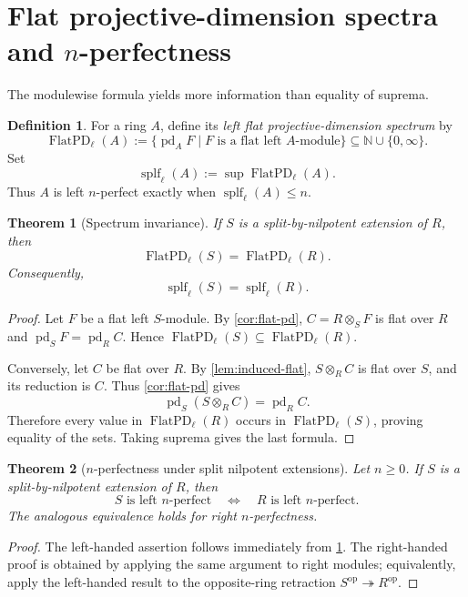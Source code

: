 \documentclass[11pt,reqno]{amsart}
\newcommand{\pd}{\operatorname{pd}}
\newcommand{\splf}{\operatorname{splf}}
\newcommand{\FlatPD}{\operatorname{FlatPD}}
\theoremstyle{plain}
\newtheorem{theorem}{Theorem}[section]
\theoremstyle{definition}
\newtheorem{definition}[definition]{Definition}
\theoremstyle{remark}
\begin{document}
\section{Flat projective-dimension spectra and \texorpdfstring{$n$}{n}-perfectness}

The modulewise formula yields more information than equality of suprema.

\begin{definition}\label{def:spectrum}
For a ring $A$, define its \emph{left flat projective-dimension spectrum} by
\[
 \FlatPD_{\ell}(A)
 :=\{\pd_AF\mid F\text{ is a flat left }A\text{-module}\}
 \subseteq\mathbb N\cup\{0,\infty\}.
\]
Set
\[
 \splf_{\ell}(A):=\sup\FlatPD_{\ell}(A).
\]
Thus $A$ is left $n$-perfect exactly when $\splf_{\ell}(A)\le n$.
\end{definition}

\begin{theorem}[Spectrum invariance]\label{thm:spectrum}
If $S$ is a split-by-nilpotent extension of $R$, then
\begin{equation}\label{eq:spectrum}
   {\ \FlatPD_{\ell}(S)=\FlatPD_{\ell}(R).\ }
\end{equation}
Consequently,
\[
   \splf_{\ell}(S)=\splf_{\ell}(R).
\]
\end{theorem}

\begin{proof}
Let $F$ be a flat left $S$-module.  By \cref{cor:flat-pd},
$C=R\otimes_SF$ is flat over $R$ and
$\pd_SF=\pd_RC$.  Hence
$\FlatPD_{\ell}(S)\subseteq\FlatPD_{\ell}(R)$.

Conversely, let $C$ be flat over $R$.  By \cref{lem:induced-flat},
$S\otimes_RC$ is flat over $S$, and its reduction is $C$.  Thus
\cref{cor:flat-pd} gives
\[
  \pd_S(S\otimes_RC)=\pd_RC.
\]
Therefore every value in $\FlatPD_{\ell}(R)$ occurs in
$\FlatPD_{\ell}(S)$, proving equality of the sets.  Taking suprema gives the last
formula.
\end{proof}

\begin{theorem}[$n$-perfectness under split nilpotent extensions]\label{thm:nperfect-general}
Let $n\ge0$.  If $S$ is a split-by-nilpotent extension of $R$, then
\[
   S\text{ is left }n\text{-perfect}
   \quad\Longleftrightarrow\quad
   R\text{ is left }n\text{-perfect}.
\]
The analogous equivalence holds for right $n$-perfectness.
\end{theorem}

\begin{proof}
The left-handed assertion follows immediately from
\cref{thm:spectrum}.  The right-handed proof is obtained by applying the same
argument to right modules; equivalently, apply the left-handed result to the
opposite-ring retraction $S^{\mathrm{op}}\twoheadrightarrow R^{\mathrm{op}}$.
\end{proof}
\end{document}
